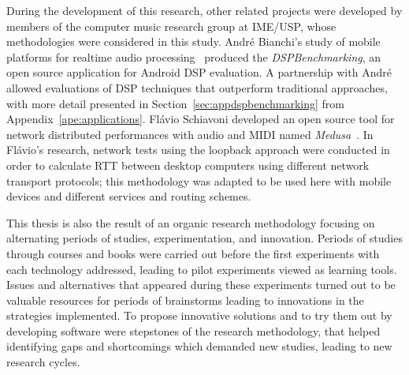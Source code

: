 During the development of this research, other related projects were developed by members of the computer music research group at IME/USP, whose methodologies were considered in this study.
André Bianchi's study of mobile platforms for realtime audio processing~\cite{Bianchi2012ontheperformance} produced the \textit{DSPBenchmarking}, an open source application for Android DSP evaluation.
A partnership with André allowed evaluations of DSP techniques that outperform traditional approaches, with more detail presented in Section~\ref{sec:appdspbenchmarking} from Appendix~\ref{ape:applications}.
Flávio Schiavoni developed an open source tool for network distributed performances with audio and MIDI named \textit{Medusa}~\cite{Schiavoni2011medusa}.
In Flávio's research, network tests using the loopback approach were conducted in order to calculate RTT between desktop computers using different network transport protocols; this methodology was adapted to be used here with mobile devices and different services and routing schemes.




This thesis is also the result of an organic research methodology focusing on alternating periods of studies, experimentation, and innovation.
Periods of studies through courses and books were carried out before the first experiments with each technology addressed, leading to pilot experiments viewed as learning tools.
Issues and alternatives that appeared during these experiments turned out to be valuable resources for periods of brainstorms leading to innovations in the strategies implemented.
To propose innovative solutions and to try them out by developing software were stepstones of the research methodology, that helped identifying gaps and shortcomings which demanded new studies, leading to new research cycles.

